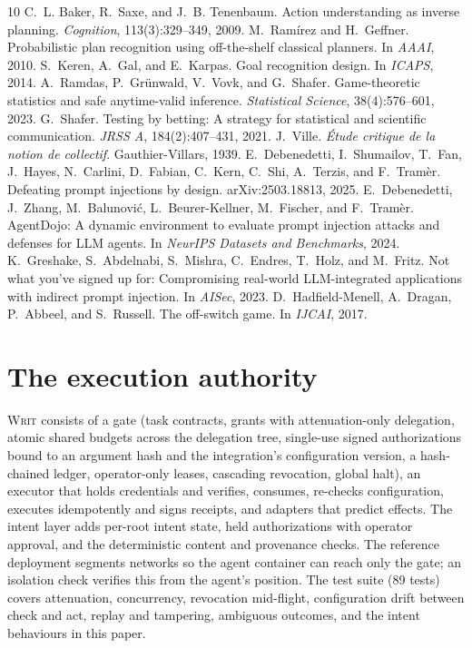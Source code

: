 \documentclass[11pt]{article}
\theoremstyle{definition}
\theoremstyle{remark}
\newcommand{\sys}{\textsc{Writ}}
\begin{document}

\begin{thebibliography}{10}
 C.~L. Baker, R.~Saxe, and J.~B. Tenenbaum. Action understanding as inverse planning. \emph{Cognition}, 113(3):329--349, 2009.
 M.~Ram\'irez and H.~Geffner. Probabilistic plan recognition using off-the-shelf classical planners. In \emph{AAAI}, 2010.
 S.~Keren, A.~Gal, and E.~Karpas. Goal recognition design. In \emph{ICAPS}, 2014.
 A.~Ramdas, P.~Gr\"unwald, V.~Vovk, and G.~Shafer. Game-theoretic statistics and safe anytime-valid inference. \emph{Statistical Science}, 38(4):576--601, 2023.
 G.~Shafer. Testing by betting: A strategy for statistical and scientific communication. \emph{JRSS A}, 184(2):407--431, 2021.
 J.~Ville. \emph{\'Etude critique de la notion de collectif}. Gauthier-Villars, 1939.
 E.~Debenedetti, I.~Shumailov, T.~Fan, J.~Hayes, N.~Carlini, D.~Fabian, C.~Kern, C.~Shi, A.~Terzis, and F.~Tram\`er. Defeating prompt injections by design. arXiv:2503.18813, 2025.
 E.~Debenedetti, J.~Zhang, M.~Balunovi\'c, L.~Beurer-Kellner, M.~Fischer, and F.~Tram\`er. AgentDojo: A dynamic environment to evaluate prompt injection attacks and defenses for LLM agents. In \emph{NeurIPS Datasets and Benchmarks}, 2024.
 K.~Greshake, S.~Abdelnabi, S.~Mishra, C.~Endres, T.~Holz, and M.~Fritz. Not what you've signed up for: Compromising real-world LLM-integrated applications with indirect prompt injection. In \emph{AISec}, 2023.
 D.~Hadfield-Menell, A.~Dragan, P.~Abbeel, and S.~Russell. The off-switch game. In \emph{IJCAI}, 2017.
\end{thebibliography}

\appendix
\section{The execution authority}
\label{app:system}
\sys{} consists of a gate (task contracts, grants with attenuation-only delegation, atomic shared budgets across the delegation tree, single-use signed authorizations bound to an argument hash and the integration's configuration version, a hash-chained ledger, operator-only leases, cascading revocation, global halt), an executor that holds credentials and verifies, consumes, re-checks configuration, executes idempotently and signs receipts, and adapters that predict effects. The intent layer adds per-root intent state, held authorizations with operator approval, and the deterministic content and provenance checks. The reference deployment segments networks so the agent container can reach only the gate; an isolation check verifies this from the agent's position. The test suite (89 tests) covers attenuation, concurrency, revocation mid-flight, configuration drift between check and act, replay and tampering, ambiguous outcomes, and the intent behaviours in this paper.
\end{document}
